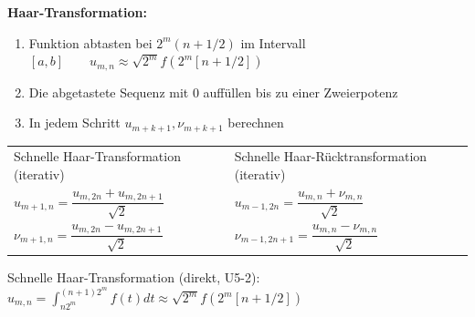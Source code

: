 \textbf{Haar-Transformation:}
\begin{enumerate}
	\item Funktion abtasten bei $2^m(n+1/2)$ im Intervall $[a,b] \qquad u_{m,n}\approx \sqrt{2^m}f(2^m[n+1/2])$ 
	\item Die abgetastete Sequenz mit 0 auffüllen bis zu einer Zweierpotenz
	\item In jedem Schritt $u_{m+k+1}, \nu_{m+k+1}$ berechnen
\end{enumerate}

\begin{tabularx}{\textwidth}{p{8cm}|X}
Schnelle Haar-Transformation (iterativ)
  & Schnelle Haar-Rücktransformation (iterativ)\\
$u_{m+1,n} = \dfrac{u_{m,2n}+u_{m,2n+1}}{\sqrt{2}}$
  & $u_{m-1,2n} = \dfrac{u_{m,n}+\nu_{m,n}}{\sqrt{2}}$ \\
$\nu_{m+1,n} = \dfrac{u_{m,2n}-u_{m,2n+1}}{\sqrt{2}}$
  & $\nu_{m-1,2n+1} = \dfrac{u_{m,n}-\nu_{m,n}}{\sqrt{2}}$
\end{tabularx}

Schnelle Haar-Transformation (direkt, U5-2): 
$u_{m,n} = \int_{n 2^m}^{(n+1)2^m} f(t) dt \approx \sqrt{2^m}f(2^m[n+1/2])$
